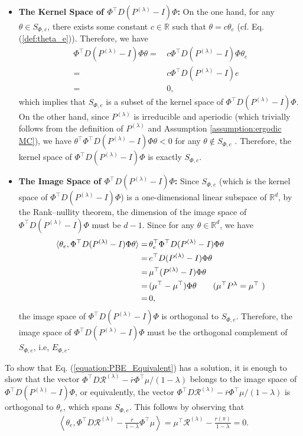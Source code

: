 \documentclass[11 pt]{article}
\begin{document}
	\begin{itemize}
		\item \textbf{The Kernel Space of $\Phi^\top D(P^{(\lambda)}-I)\Phi$:} On the one hand, for any $\theta \in S_{\Phi,e}$, there exists some constant $c\in\mathbb{R}$ such that $\theta  =c\theta_e$ (cf. Eq. (\ref{def:theta_e})). Therefore, we have
		\begin{align*}
			\Phi^\top D(P^{(\lambda)}-I)\Phi \theta=\,&c \Phi^\top D(P^{(\lambda)}-I)\Phi  \theta_e\\
			=\,&c \Phi^\top D(P^{(\lambda)}-I)e\\
			=\,&0,
		\end{align*}
		which implies that $S_{\Phi,e}$ is a subset of the kernel space of $\Phi^\top D(P^{(\lambda)}-I)\Phi$. On the other hand, since $P^{(\lambda)}$ is irreducible and aperiodic (which trivially follows from the definition of $P^{(\lambda)}$ and Assumption \ref{assumption:ergodic MC}), we have $\theta^\top \Phi^\top  D(P^{(\lambda)}-I)\Phi \theta<0$ for any $\theta\notin S_{\Phi,e}$ \cite[Lemma 7]{tsitsiklis1999average}. Therefore, the kernel space of $\Phi^\top D(P^{(\lambda)}-I)\Phi$ is exactly $S_{\Phi,e}$.
		\item \textbf{The Image Space of $\Phi^\top D(P^{(\lambda)}-I)\Phi$:} Since $S_{\Phi,e}$ (which is the kernel space of $\Phi^\top D(P^{(\lambda)}-I)\Phi$) is a one-dimensional linear subspace of $\mathbb{R}^d$, by the Rank–nullity theorem, the dimension of the image space of $\Phi^\top D(P^{(\lambda)}-I)\Phi$ must be $d-1$. Since for any $\theta\in\mathbb{R}^d$, we have
		\begin{align*}
			\langle \theta_e, \Phi^\top D(P^{(\lambda)}-I)\Phi\theta \rangle=\,&\theta_e^\top  \Phi^\top D(P^{(\lambda)}-I)\Phi\theta\\
			=\,&e^\top D(P^{(\lambda)}-I)\Phi\theta\\
			=\,&\mu^\top (P^{(\lambda)}-I)\Phi\theta\\
			=\,&(\mu^\top -\mu^\top)\Phi\theta\tag{$\mu^\top P^{\lambda}=\mu^\top$ }\\
			=\,&0,
		\end{align*}
		the image space of $\Phi^\top D(P^{(\lambda)}-I)\Phi$ is orthogonal to $S_{\Phi,e}$. Therefore, the image space of $\Phi^\top D(P^{(\lambda)}-I)\Phi$ must be the orthogonal complement of $S_{\Phi, e}$, i.e, $E_{\Phi, e}$.
	\end{itemize}
	
	To show that Eq. (\ref{equation:PBE_Equivalent}) has a solution, it is enough to show that the vector $\Phi^\top D\mathcal{R}^{(\lambda)}-\bar{r}\Phi^\top \mu/(1-\lambda)$ belongs to the image space of $\Phi^\top D(P^{(\lambda)}-I)\Phi$, or equivalently, the vector $\Phi^\top D\mathcal{R}^{(\lambda)}-\bar{r}\Phi^\top \mu/(1-\lambda)$ is orthogonal to $\theta_e$, which spans $S_{\Phi,e}$. This follows by observing that
	\begin{align*}
		\left\langle \theta_e,\Phi^\top D\mathcal{R}^{(\lambda)}-\frac{\bar{r}}{1-\lambda}\Phi^\top \mu\right\rangle=\mu^\top \mathcal{R}^{(\lambda)}-\frac{r(\pi)}{1-\lambda}=0.
	\end{align*}
	
\end{document}
